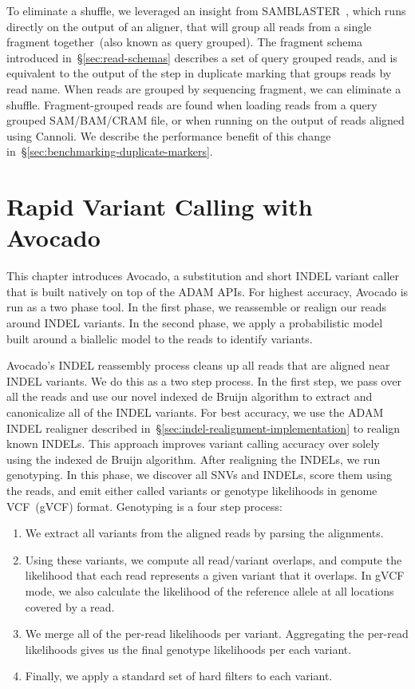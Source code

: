 \documentclass[phd]{ucbthesis}
\begin{document}
To eliminate a shuffle, we leveraged an insight from
{SAMBLASTER}~\cite{faust14}, which runs directly on the output of an
aligner, that will group all reads from a single fragment together~(also known
as query grouped). The fragment schema introduced in~\S\ref{sec:read-schemas}
describes a set of query grouped reads, and is equivalent to the output of the
step in duplicate marking that groups reads by read name. When reads are grouped
by sequencing fragment, we can eliminate a shuffle. Fragment-grouped reads are
found when loading reads from a query grouped
SAM/BAM/CRAM file, or when running on the output of reads aligned using
{Cannoli}. We describe the performance benefit of this change
in~\S\ref{sec:benchmarking-duplicate-markers}.

\chapter{Rapid Variant Calling with {Avocado}}
\label{chap:avocado}

This chapter introduces {Avocado}, a substitution and short INDEL variant
caller that is built natively on top of the {ADAM} APIs. For highest
accuracy, {Avocado} is run as a two phase tool. In the first phase, we
reassemble or realign our reads around INDEL variants. In the second phase, we
apply a probabilistic model built around a biallelic model to the reads to
identify variants.

{Avocado}'s INDEL reassembly process cleans up all reads that are aligned
near INDEL variants. We do this as a two step process. In the first step, we
pass over all the reads and use our novel indexed de Bruijn algorithm to extract
and canonicalize all of the INDEL variants. For best accuracy, we use the
{ADAM} INDEL realigner described
in~\S\ref{sec:indel-realignment-implementation} to realign known INDELs. This
approach improves variant calling accuracy over solely using the indexed de Bruijn
algorithm.
After realigning the INDELs, we run genotyping. In this phase, we discover all
SNVs and INDELs, score them using the reads, and emit either called variants
or genotype likelihoods in genome VCF~(gVCF) format. Genotyping is a four step
process:

\begin{enumerate}
\item We extract all variants from the aligned reads by parsing the alignments.
\item Using these variants, we compute all read/variant overlaps, and compute
the likelihood that each read represents a given variant that it overlaps. In
gVCF mode, we also calculate the likelihood of the reference allele at all
locations covered by a read.
\item We merge all of the per-read likelihoods per variant. Aggregating the
  per-read likelihoods gives us the final genotype likelihoods per each variant.
\item Finally, we apply a standard set of hard filters to each variant.
\end{enumerate}
\end{document}

